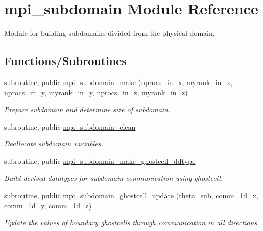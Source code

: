\hypertarget{namespacempi__subdomain}{}\section{mpi\+\_\+subdomain Module Reference}
\label{namespacempi__subdomain}


Module for building subdomains divided from the physical domain.  


\subsection*{Functions/\+Subroutines}
\begin{DoxyCompactItemize}
\item 
subroutine, public \mbox{\hyperlink{namespacempi__subdomain_a3a1e7cf64aafbebd3c09b92fc56bd311}{mpi\+\_\+subdomain\+\_\+make}} (nprocs\+\_\+in\+\_\+x, myrank\+\_\+in\+\_\+x, nprocs\+\_\+in\+\_\+y, myrank\+\_\+in\+\_\+y, nprocs\+\_\+in\+\_\+z, myrank\+\_\+in\+\_\+z)
\begin{DoxyCompactList}\small\item\em Prepare subdomain and determine size of subdomain. \end{DoxyCompactList}\item 
subroutine, public \mbox{\hyperlink{namespacempi__subdomain_a56e9f2afd59e45fcada0f1c21a90eefe}{mpi\+\_\+subdomain\+\_\+clean}}
\begin{DoxyCompactList}\small\item\em Deallocate subdomain variables. \end{DoxyCompactList}\item 
subroutine, public \mbox{\hyperlink{namespacempi__subdomain_ad788c273d92ea7058caf0874bffdad6d}{mpi\+\_\+subdomain\+\_\+make\+\_\+ghostcell\+\_\+ddtype}}
\begin{DoxyCompactList}\small\item\em Build derived datatypes for subdomain communication using ghostcell. \end{DoxyCompactList}\item 
subroutine, public \mbox{\hyperlink{namespacempi__subdomain_a2e34a77537009dd448375e8fdc8d5b62}{mpi\+\_\+subdomain\+\_\+ghostcell\+\_\+update}} (theta\+\_\+sub, comm\+\_\+1d\+\_\+x, comm\+\_\+1d\+\_\+y, comm\+\_\+1d\+\_\+z)
\begin{DoxyCompactList}\small\item\em Update the values of boundary ghostcells through communication in all directions. \end{DoxyCompactList}\item 

\end{DoxyCompactItemize}
